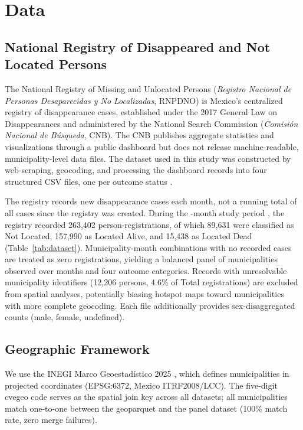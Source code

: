 \section{Data}
\label{sec:data}
\subsection{National Registry of Disappeared and Not Located Persons}

The National Registry of Missing and Unlocated Persons (\textit{Registro Nacional de Personas Desaparecidas y No Localizadas}, RNPDNO) is Mexico's centralized registry of disappearance cases, established under the 2017 General Law on Disappearances \citep{ley_general_2017} and administered by the National Search Commission (\textit{Comisión Nacional de Búsqueda}, CNB). The CNB publishes aggregate statistics and visualizations through a public dashboard \citep{cnb_rnpdno} but does not release machine-readable, municipality-level data files. The dataset used in this study was constructed by web-scraping, geocoding, and processing the dashboard records into four structured CSV files, one per outcome status \citep{escobar_rnpdno_2026}.

The registry records new disappearance cases each month, not a running total of all cases since the registry was created. During the \nmonths{}-month study period \studyperiod{}, the registry recorded 263,402 person-registrations, of which 89,631 were classified as Not Located, 157,990 as Located Alive, and 15,438 as Located Dead (Table~\ref{tab:dataset}). Municipality-month combinations with no recorded cases are treated as zero registrations, yielding a balanced panel of \nmunis{} municipalities observed over \nmonths{} months and four outcome categories. Records with unresolvable municipality identifiers (12,206 persons, 4.6\% of Total registrations) are excluded from spatial analyses, potentially biasing hotspot maps toward municipalities with more complete geocoding. Each file additionally provides sex-disaggregated counts (male, female, undefined).


\subsection{Geographic Framework}

We use the INEGI Marco Geoestad\'{i}stico 2025 \citep{inegi_ageeml}, which defines \nmunis{} municipalities in projected coordinates (EPSG:6372, Mexico ITRF2008/LCC).
The five-digit cvegeo code serves as the spatial join key across all datasets; all \nmunis{} municipalities match one-to-one between the geoparquet and the panel dataset (100\% match rate, zero merge failures).
